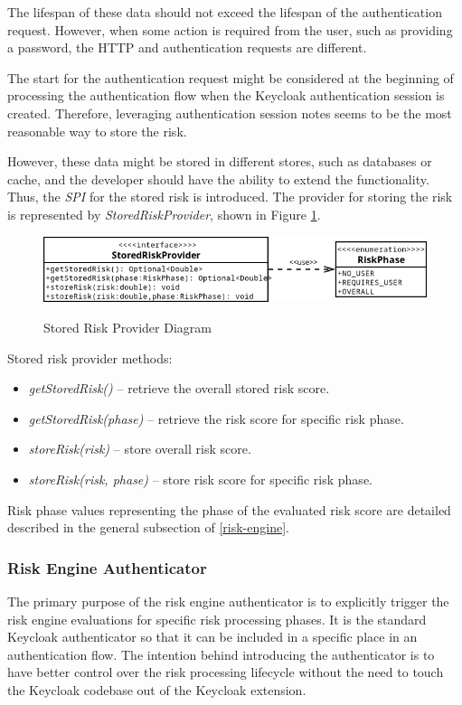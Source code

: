 The lifespan of these data should not exceed the lifespan of the authentication request.
However, when some action is required from the user, such as providing a password, the HTTP and authentication requests are different.

The start for the authentication request might be considered at the beginning of processing the authentication flow when the Keycloak authentication session is created.
Therefore, leveraging authentication session notes seems to be the most reasonable way to store the risk.

However, these data might be stored in different stores, such as databases or cache, and the developer should have the ability to extend the functionality.
Thus, the \textit{SPI} for the stored risk is introduced.
The provider for storing the risk is represented by \textit{StoredRiskProvider}, shown in Figure \ref{fig:design-stored-risk-diagram}.

\begin{figure}[htbp]
  \centering
  \includegraphics[width=1\textwidth]{img/sections/5-design/stored-risk-provider.png}
  \label{fig:design-stored-risk-diagram}
  \caption{Stored Risk Provider Diagram}
\end{figure}

Stored risk provider methods:
\begin{itemize}
    \item \textit{getStoredRisk()} -- retrieve the overall stored risk score.
    \item \textit{getStoredRisk(phase)} -- retrieve the risk score for specific risk phase.
    \item \textit{storeRisk(risk)} -- store overall risk score.
    \item \textit{storeRisk(risk, phase)} -- store risk score for specific risk phase.
\end{itemize}

Risk phase values representing the phase of the evaluated risk score are detailed described in the general subsection of \ref{risk-engine}.

\subsubsection{Risk Engine Authenticator}
The primary purpose of the risk engine authenticator is to explicitly trigger the risk engine evaluations for specific risk processing phases.
It is the standard Keycloak authenticator so that it can be included in a specific place in an authentication flow.
The intention behind introducing the authenticator is to have better control over the risk processing lifecycle without the need to touch the Keycloak codebase out of the Keycloak extension.

